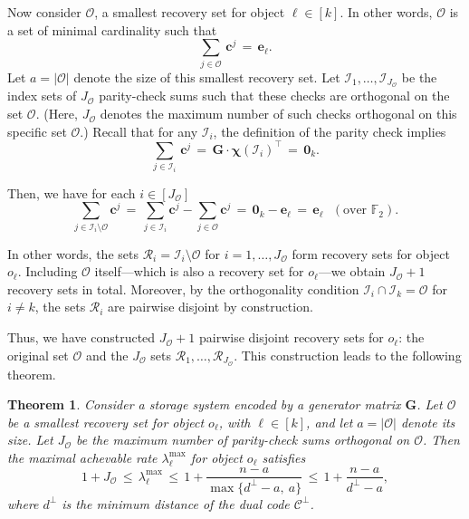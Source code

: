\documentclass[conference,letterpaper]{IEEEtran}
\newtheorem{theorem}{Theorem}
\begin{document}
Now consider $\mathcal{O}$, a smallest recovery set for object ${\ell} \in [k]$. In other words, $\mathcal{O}$ is a set of minimal cardinality such that
\[
\sum\limits_{j \in \mathcal{O}}\,\boldsymbol{c}^j \,=\, \boldsymbol{e}_{\ell}.
\]
Let $a = |\mathcal{O}|$ denote the size of this smallest recovery set. Let $\mathcal{I}_1, \dots, \mathcal{I}_{J_{\mathcal{O}}}$ be the index sets of $J_{\mathcal{O}}$ parity-check sums such that these checks are orthogonal on the set $\mathcal{O}$. (Here, $J_{\mathcal{O}}$ denotes the maximum number of such checks orthogonal on this specific set $\mathcal{O}$.) Recall that for any $\mathcal{I}_{i}$, the definition of the parity check implies 
\[
\sum_{j \in \mathcal{I}_i}\, \boldsymbol{c}^j \,=\, \boldsymbol{G}\cdot\boldsymbol{\chi}(\mathcal{I}_i)^{\top} \,=\, \boldsymbol{0}_k.
\]

Then, we have for each $i \in [J_{\mathcal{O}}]$
\[
\sum\limits_{j \in \mathcal{I}_i\setminus\mathcal{O}}\boldsymbol{c}^j \,=\, \sum\limits_{j \in \mathcal{I}_i}\boldsymbol{c}^j - \sum\limits_{j \in \mathcal{O}}\boldsymbol{c}^j \,=\, \boldsymbol{0}_k - \boldsymbol{e}_{\ell} \,=\, \boldsymbol{e}_{\ell} \ \ \ (\text{over } \mathbb{F}_2).
\]

In other words, the sets \( \mathcal{R}_i = \mathcal{I}_i \setminus \mathcal{O} \) for \( i = 1, \dots, J_{\mathcal{O}} \) form recovery sets for object \( o_\ell \). Including \( \mathcal{O} \) itself—which is also a recovery set for \( o_\ell \)—we obtain \( J_{\mathcal{O}} + 1 \) recovery sets in total. Moreover, by the orthogonality condition \( \mathcal{I}_i \cap \mathcal{I}_k = \mathcal{O} \) for \( i \ne k \), the sets \( \mathcal{R}_i \) are pairwise disjoint by construction.

Thus, we have constructed \( J_{\mathcal{O}} + 1 \) pairwise disjoint recovery sets for \( o_\ell \): the original set \( \mathcal{O} \) and the \( J_{\mathcal{O}} \) sets \( \mathcal{R}_1, \dots, \mathcal{R}_{J_{\mathcal{O}}} \). This construction leads to the following theorem.

\begin{theorem}\label{thm:general_bound_demand}
Consider a storage system encoded by a generator matrix \( \boldsymbol{G} \). Let \( \mathcal{O} \) be a smallest recovery set for object \( o_\ell \), with \( \ell \in [k] \), and let \( a = |\mathcal{O}| \) denote its size. Let \( J_{\mathcal{O}} \) be the maximum number of parity-check sums orthogonal on \( \mathcal{O} \). Then the maximal achevable rate \( \lambda_\ell^{\max} \) for object \( o_\ell \) satisfies
\[
1 + J_{\mathcal{O}} \,\le\, \lambda_{\ell}^{\max} \,\le\, 1 + \frac{n - a}{\max\{d^\perp - a,\ a\}} \,\le\, 1 + \frac{n - a}{d^\perp - a},
\]
where \( d^{\perp} \) is the minimum distance of the dual code \( \mathcal{C}^{\perp} \).
\end{theorem}
\end{document}

